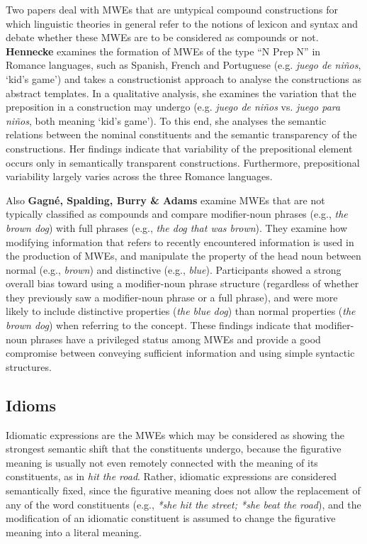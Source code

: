 \documentclass[output=paper]{langsci/langscibook}
\begin{document}
Two papers deal with MWEs that are untypical compound constructions
for which linguistic theories in general refer to the notions of
lexicon and syntax and debate whether these MWEs are to be considered
as compounds or not. \textbf{Hennecke} examines the formation of MWEs
of the type ``N Prep N'' in Romance languages, such as Spanish, French
and Portuguese (e.g. \textit{juego de niños}, `kid’s game') and takes
a constructionist approach to analyse the constructions as abstract
templates. In a qualitative analysis, she examines the variation that
the preposition in a construction may undergo (e.g. \textit{juego de
  niños} vs. \textit{juego para niños}, both meaning `kid’s game'). To
this end, she analyses the semantic relations between the nominal
constituents and the semantic transparency of the constructions. Her
findings indicate that variability of the prepositional element occurs
only in semantically transparent constructions. Furthermore,
prepositional variability largely varies across the three Romance
languages.

Also \textbf{Gagné, Spalding, Burry \& Adams} examine MWEs that are
not typically classified as compounds and compare modifier-noun
phrases (e.g., \textit{the brown dog}) with full phrases (e.g.,
\textit{the dog that was brown}). They examine how modifying
information that refers to recently encountered information is used in
the production of MWEs, and manipulate the property of the head noun
between normal (e.g., \textit{brown}) and distinctive (e.g.,
\textit{blue}). Participants showed a strong overall bias toward using
a modifier-noun phrase structure (regardless of whether they
previously saw a modifier-noun phrase or a full phrase), and were more
likely to include distinctive properties (\textit{the blue dog}) than
normal properties (\textit{the brown dog}) when referring to the
concept. These findings indicate that modifier-noun phrases have a
privileged status among MWEs and provide a good compromise between
conveying sufficient information and using simple syntactic
structures.


\subsection{Idioms}
\label{sec:idioms}

Idiomatic expressions are the MWEs which may be considered as showing
the strongest semantic shift that the constituents undergo, because
the figurative meaning is usually not even remotely connected with the
meaning of its constituents, as in \textit{hit the road}. Rather,
idiomatic expressions are considered semantically fixed, since the
figurative meaning does not allow the replacement of any of the word
constituents (e.g., \textit{*she hit the street; *she beat the road}),
and the modification of an idiomatic constituent is assumed to change
the figurative meaning into a literal meaning.
\end{document}
